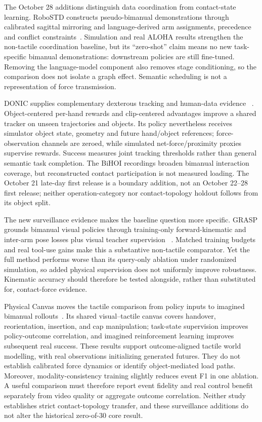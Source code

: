 The October 28 additions distinguish data coordination from contact-state
learning. RoboSTD constructs pseudo-bimanual demonstrations through calibrated
sagittal mirroring and language-derived arm assignments, precedence and conflict
constraints~\cite{update2026robostd}. Simulation and real ALOHA results strengthen
the non-tactile coordination baseline, but its ``zero-shot'' claim means no new
task-specific bimanual demonstrations: downstream policies are still fine-tuned.
Removing the language-model component also removes stage conditioning, so the
comparison does not isolate a graph effect. Semantic scheduling is not a
representation of force transmission.

DONIC supplies complementary dexterous tracking and human-data evidence
~\cite{update2026donic}. Object-centered per-hand rewards and clip-centered
advantages improve a shared tracker on unseen trajectories and objects. Its
policy nevertheless receives simulator object state, geometry and future
hand/object references; force-observation channels are zeroed, while simulated
net-force/proximity proxies supervise rewards. Success measures joint tracking
thresholds rather than general semantic task completion. The BiHOI recordings
broaden bimanual interaction coverage, but reconstructed contact participation is
not measured loading. The October 21 late-day first release is a boundary
addition, not an October 22--28 first release; neither operation-category nor
contact-topology holdout follows from its object split.

The new surveillance evidence makes the baseline question more specific.
GRASP grounds bimanual visual policies through training-only forward-kinematic
and inter-arm pose losses plus visual teacher supervision
~\cite{update2026graspbimanual}. Matched training budgets and real tool-use gains
make this a substantive non-tactile comparator. Yet the full method performs
worse than its query-only ablation under randomized simulation, so added physical
supervision does not uniformly improve robustness. Kinematic accuracy should
therefore be tested alongside, rather than substituted for, contact-force evidence.

Physical Canvas moves the tactile comparison from policy inputs to imagined
bimanual rollouts~\cite{update2026physcanvas}. Its shared visual--tactile canvas
covers handover, reorientation, insertion, and cap manipulation; task-state
supervision improves policy-outcome correlation, and imagined reinforcement
learning improves subsequent real success. These results support outcome-aligned
tactile world modelling, with real observations initializing generated futures.
They do not establish calibrated force dynamics or identify object-mediated
load paths. Moreover, modality-consistency training slightly reduces event F1
in one ablation. A useful comparison must therefore report event fidelity and
real control benefit separately from video quality or aggregate outcome
correlation. Neither study establishes strict contact-topology transfer, and
these surveillance additions do not alter the historical zero-of-30 core result.

